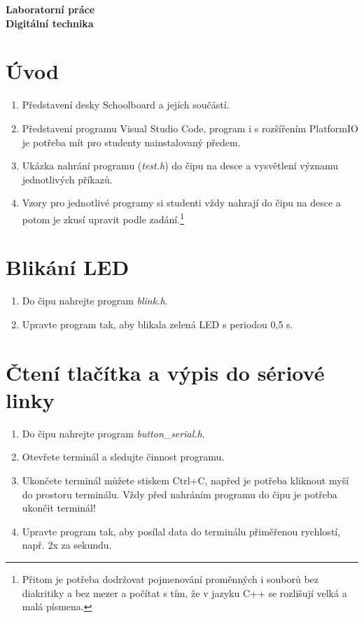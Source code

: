 \documentclass[12pt]{article}
\begin{document}
\begin{center}
	\large \textbf{Laboratorní práce} \\  
	\Huge \textbf{Digitální technika} 
\end{center}

\section{Úvod}

\begin{enumerate}
	\item Představení desky Schoolboard a jejích součástí. 
	\item Představení programu Visual Studio Code, program i s rozšířením PlatformIO je potřeba mít pro studenty nainstalovaný předem. 
	\item Ukázka nahrání programu (\textit{test.h}) do čipu na desce a vysvětlení významu jednotlivých příkazů. 
	\item Vzory pro jednotlivé programy si studenti vždy nahrají do čipu na desce a potom je zkusí upravit podle 
	zadání.\footnote{Přitom je potřeba dodržovat pojmenování proměnných i souborů bez diakritiky a bez mezer 
	a počítat s tím, že v jazyku C++ se rozlišují velká a malá písmena. } 
	
\end{enumerate}

\section{Blikání LED}

\begin{enumerate} 
	\item Do čipu nahrejte program \textit{blink.h}. 
	\item Upravte program tak, aby blikala zelená LED s periodou 0,5 s. 
\end{enumerate} 

\section{Čtení tlačítka a výpis do sériové linky}

\begin{enumerate} 
	\item Do čipu nahrejte program \textit{button\_serial.h}.
	\item Otevřete terminál a sledujte činnost programu.  
	\item Ukončete terminál můžete stiskem Ctrl+C, napřed je potřeba kliknout myší do prostoru terminálu. 
	Vždy před nahráním programu do čipu je potřeba ukončit terminál!
	\item Upravte program tak, aby posílal data do terminálu přiměřenou rychlostí, např. 2x za sekundu. 
\end{enumerate} 
\end{document}
